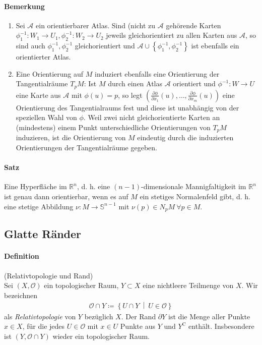 \documentclass[12pt,a4paper,fleqn]{article}
\def\set#1{{\left\{ #1 \right\}}}
\def\Mid{\ \middle|\ }
\def\R{{\mathbb{R}}}
\begin{document}
\paragraph{Bemerkung}
\begin{enumerate}
\item Sei $\mathcal{A}$ ein orientierbarer Atlas. Sind (nicht zu $\mathcal{A}$ gehörende Karten $\phi^{-1}_1\colon W_1 \rightarrow U_1, \phi^{-1}_2\colon W_2 \rightarrow U_2$ jeweils gleichorientiert zu allen Karten aus $\mathcal{A}$, so sind auch $\phi_1^{-1}, \phi_2^{-1}$ gleichorientiert und $\mathcal{A} \cup \set{\phi_1^{-1}, \phi_2^{-1}}$ ist ebenfalls ein orientierter Atlas.
\item Eine Orientierung auf $M$ induziert ebenfalls eine Orientierung der Tangentialräume $T_p M$: Ist $M$ durch einen Atlas $\mathcal{A}$ orientiert und $\phi^{-1}\colon W \rightarrow U$ eine Karte aus $\mathcal{A}$ mit $\phi(u) = p$, so legt ${(\frac{\partial \phi}{\partial x_1}(u), \dotsc, \frac{\partial \phi}{\partial x_m}(u))}$ eine Orientierung des Tangentialraums fest und diese ist unabhängig von der speziellen Wahl von $\phi$. Weil zwei nicht gleichorientierte Karten an (mindestens) einem Punkt unterschiedliche Orientierungen von $T_p M$ induzieren, ist die Orientierung von $M$ eindeutig durch die induzierten Orientierungen der Tangentialräume gegeben.
\end{enumerate}

\paragraph{Satz} Eine Hyperfläche im $\R^n$, d. h. eine $(n - 1)$-dimensionale Mannigfaltigkeit im $\R^n$ ist genau dann orientierbar, wenn es auf $M$ ein stetiges Normalenfeld gibt, d. h. eine stetige Abbildung $\nu\colon M \rightarrow \mathbb{S}^{n-1}$ mit $\nu(p) \in N_p M\ \forall p \in M$.

\subsection{Glatte Ränder}

\paragraph{Definition} (Relativtopologie und Rand)\\
Sei $(X, \mathcal{O})$ ein topologischer Raum, $Y \subset X$ eine nichtleere Teilmenge von $X$. Wir bezeichnen
\begin{align*}
\mathcal{O} \cap Y \coloneqq \set{U\cap Y \Mid U \in \mathcal{O}}
\end{align*}
als \textit{Relativtopologie} von $Y$ bezüglich $X$.
Der Rand $\partial Y$ ist die Menge aller Punkte $x \in X$, für die jedes $U \in \mathcal{O}$ mit $x \in U$ Punkte aus $Y$ und $Y^\mathrm{C}$ enthält. Insbesondere ist $(Y, \mathcal{O} \cap Y)$ wieder ein topologischer Raum. 
\end{document}

